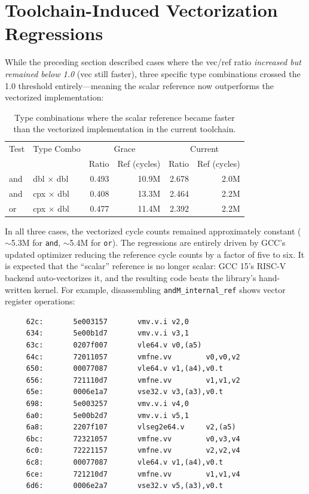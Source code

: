 \section{Toolchain-Induced Vectorization Regressions}

While the preceding section described cases where the vec/ref ratio \emph{increased but remained below 1.0} (vec still faster), three specific type combinations crossed the 1.0 threshold entirely---meaning the scalar reference now outperforms the vectorized implementation:

\begin{table}[H]
\centering
\caption{Type combinations where the scalar reference became faster than the vectorized implementation in the current toolchain.}
\label{tab:regressions}
\small
\begin{tabular}{l l r r r r}
\toprule
Test & Type Combo & \multicolumn{2}{c}{Grace} & \multicolumn{2}{c}{Current} \\
 & & Ratio & Ref (cycles) & Ratio & Ref (cycles) \\
\midrule
and & dbl $\times$ dbl & 0.493 & 10.9M & 2.678 & 2.0M \\
and & cpx $\times$ dbl & 0.408 & 13.3M & 2.464 & 2.2M \\
or & cpx $\times$ dbl & 0.477 & 11.4M & 2.392 & 2.2M \\
\bottomrule
\end{tabular}
\end{table}

In all three cases, the vectorized cycle counts remained approximately constant ($\sim$5.3M for \texttt{and}, $\sim$5.4M for \texttt{or}). The regressions are entirely driven by GCC's updated optimizer reducing the reference cycle counts by a factor of five to six. It is expected that the ``scalar'' reference is no longer scalar: GCC 15's RISC-V backend auto-vectorizes it, and the resulting code beats the library's hand-written kernel. For example, disassembling \texttt{andM\_internal\_ref} shows vector register operations:

\begin{verbatim}
     62c:       5e003157       vmv.v.i v2,0
     634:       5e00b1d7       vmv.v.i v3,1
     63c:       0207f007       vle64.v v0,(a5)
     64c:       72011057       vmfne.vv        v0,v0,v2
     650:       00077087       vle64.v v1,(a4),v0.t
     656:       721110d7       vmfne.vv        v1,v1,v2
     65e:       0006e1a7       vse32.v v3,(a3),v0.t
     698:       5e003257       vmv.v.i v4,0
     6a0:       5e00b2d7       vmv.v.i v5,1
     6a8:       2207f107       vlseg2e64.v     v2,(a5)
     6bc:       72321057       vmfne.vv        v0,v3,v4
     6c0:       72221157       vmfne.vv        v2,v2,v4
     6c8:       00077087       vle64.v v1,(a4),v0.t
     6ce:       721210d7       vmfne.vv        v1,v1,v4
     6d6:       0006e2a7       vse32.v v5,(a3),v0.t
\end{verbatim}

